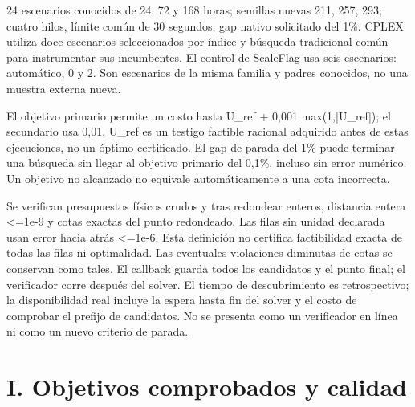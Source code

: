 \documentclass[a4paper,10pt]{article}
\begin{document}
24 escenarios conocidos de 24, 72 y 168 horas; semillas nuevas 211, 257,
293; cuatro hilos, límite común de 30 segundos, gap nativo solicitado del 1\%.
CPLEX utiliza doce escenarios seleccionados por índice y búsqueda
tradicional común para instrumentar sus incumbentes. El control de
ScaleFlag usa seis escenarios: automático, 0 y 2. Son escenarios de la
misma familia y padres conocidos, no una muestra externa nueva.

El objetivo primario permite un costo hasta U\_ref + 0,001 max(1,|U\_ref|);
el secundario usa 0,01. U\_ref es un testigo factible racional adquirido
antes de estas ejecuciones, no un óptimo certificado. El gap de parada
del 1\% puede terminar una búsqueda sin llegar al objetivo primario del
0,1\%, incluso sin error numérico. Un objetivo no alcanzado no equivale
automáticamente a una cota incorrecta.

Se verifican presupuestos físicos crudos y tras redondear enteros,
distancia entera <=1e-9 y cotas exactas del punto redondeado. Las filas
sin unidad declarada usan error hacia atrás <=1e-6. Esta definición
no certifica factibilidad exacta de todas las filas ni optimalidad.
Las eventuales violaciones diminutas de cotas se conservan como tales.
El callback guarda todos los candidatos y el punto final; el verificador
corre después del solver. El tiempo de descubrimiento es retrospectivo;
la disponibilidad real incluye la espera hasta fin del solver y el
costo de comprobar el prefijo de candidatos. No se presenta como un
verificador en línea ni como un nuevo criterio de parada.

\section*{I. Objetivos comprobados y calidad}

\begin{center}\small{}\end{center}
\end{document}
